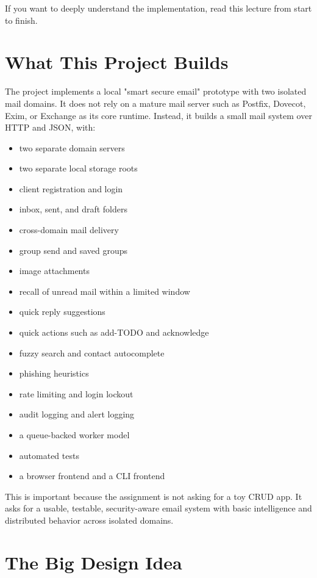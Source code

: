 \documentclass[11pt,a4paper]{article}
\begin{document}
If you want to deeply understand the implementation, read this lecture from start to finish.


\section{What This Project Builds}

The project implements a local "smart secure email" prototype with two isolated mail domains. It does not rely on a mature mail server such as Postfix, Dovecot, Exim, or Exchange as its core runtime. Instead, it builds a small mail system over HTTP and JSON, with:

\begin{itemize}
\item two separate domain servers
\item two separate local storage roots
\item client registration and login
\item inbox, sent, and draft folders
\item cross-domain mail delivery
\item group send and saved groups
\item image attachments
\item recall of unread mail within a limited window
\item quick reply suggestions
\item quick actions such as add-TODO and acknowledge
\item fuzzy search and contact autocomplete
\item phishing heuristics
\item rate limiting and login lockout
\item audit logging and alert logging
\item a queue-backed worker model
\item automated tests
\item a browser frontend and a CLI frontend
\end{itemize}

This is important because the assignment is not asking for a toy CRUD app. It asks for a usable, testable, security-aware email system with basic intelligence and distributed behavior across isolated domains.


\section{The Big Design Idea}
\end{document}

